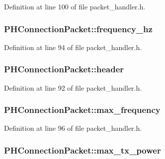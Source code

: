 Definition at line 100 of file packet\-\_\-handler.\-h.

\hypertarget{struct_p_h_connection_packet_a50a68f68b6f7f8d07f91f9076d638dbd}{
\subsubsection[{frequency\-\_\-hz}]{ P\-H\-Connection\-Packet\-::frequency\-\_\-hz}}\label{struct_p_h_connection_packet_a50a68f68b6f7f8d07f91f9076d638dbd}


Definition at line 94 of file packet\-\_\-handler.\-h.

\hypertarget{struct_p_h_connection_packet_a52261a934b08802064ddd177d22f5a1b}{
\subsubsection[{header}]{ P\-H\-Connection\-Packet\-::header}}\label{struct_p_h_connection_packet_a52261a934b08802064ddd177d22f5a1b}


Definition at line 92 of file packet\-\_\-handler.\-h.

\hypertarget{struct_p_h_connection_packet_a607b2aff285e735c41dee293f8144be0}{
\subsubsection[{max\-\_\-frequency}]{ P\-H\-Connection\-Packet\-::max\-\_\-frequency}}\label{struct_p_h_connection_packet_a607b2aff285e735c41dee293f8144be0}


Definition at line 96 of file packet\-\_\-handler.\-h.

\hypertarget{struct_p_h_connection_packet_aaeff460e39a62242df16ffce090b0760}{
\subsubsection[{max\-\_\-tx\-\_\-power}]{ P\-H\-Connection\-Packet\-::max\-\_\-tx\-\_\-power}}\label{struct_p_h_connection_packet_aaeff460e39a62242df16ffce090b0760}


